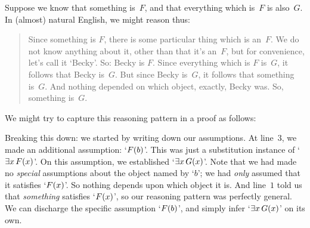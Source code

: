 Suppose we know that something is~$F$, and that everything which is~$F$ is also~$G$. In (almost) natural English, we might reason thus:
	\begin{quote}
		Since something is $F$, there is some particular thing which is an~$F$. We do not know anything about it, other than that it's an~$F$, but for convenience, let's call it `Becky'. So: Becky is $F$. Since everything which is $F$ is~$G$, it follows that Becky is~$G$. But since Becky is~$G$, it follows that something is~$G$. And nothing depended on which object, exactly, Becky was. So, something is~$G$.
	\end{quote}
We might try to capture this reasoning pattern in a proof as follows:
\begin{fitchproof}
	\PR
	\PR
	\open
		\AS
		 
	\close
\end{fitchproof}\noindent
Breaking this down: we started by writing down our assumptions. At line~$3$, we made an additional assumption: `$F(b)$'. This was just a substitution instance of `$\exists x\,F(x)$'. On this assumption, we established `$\exists x\,G(x)$'. Note that we had made no \emph{special} assumptions about the object named by `$b$'; we had \emph{only} assumed that it satisfies `$F(x)$'. So nothing depends upon which object it is. And line~$1$ told us that \emph{something} satisfies `$F(x)$', so our reasoning pattern was perfectly general. We can discharge the specific assumption `$F(b)$', and simply infer `$\exists x\,G(x)$' on its own.

